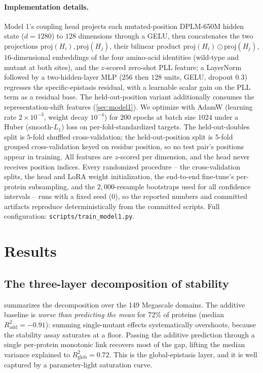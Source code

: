 \documentclass{article}
\begin{document}
\paragraph{Implementation details.}
Model 1's coupling head projects each mutated-position DPLM-650M hidden state
($d=1280$) to $128$ dimensions through a GELU, then concatenates the two
projections $\text{proj}(H_i),\text{proj}(H_j)$, their bilinear product
$\text{proj}(H_i)\odot\text{proj}(H_j)$, $16$-dimensional embeddings of the four
amino-acid identities (wild-type and mutant at both sites), and the $z$-scored
zero-shot PLL feature; a LayerNorm followed by a
two-hidden-layer MLP ($256$ then $128$ units, GELU, dropout $0.3$) regresses the
specific-epistasis residual, with a learnable scalar gain on the PLL term as a
residual base. The held-out-position variant additionally consumes the
representation-shift features (\cref{sec:model1}). We optimize with AdamW
(learning rate $2\times10^{-3}$, weight decay $10^{-4}$) for $200$ epochs at batch
size $1024$ under a Huber (smooth-$L_1$) loss on per-fold-standardized targets.
The held-out-doubles split is $5$-fold shuffled cross-validation; the
held-out-position split is $5$-fold grouped cross-validation keyed on residue
position, so no test pair's positions appear in training. All features are
$z$-scored per dimension, and the head never receives position indices. Every
randomized procedure -- the cross-validation splits, the head and LoRA weight
initialization, the end-to-end fine-tune's per-protein subsampling, and the
$2{,}000$-resample bootstraps used for all confidence intervals -- runs with a
fixed seed ($0$), so the reported numbers and committed artifacts reproduce
deterministically from the committed scripts. Full configuration:
\texttt{scripts/train\_model1.py}.

\section{Results}
\label{sec:results}

\subsection{The three-layer decomposition of stability}
\label{sec:results-decomp}

 summarizes the decomposition over the 149 Megascale
domains. The additive baseline is \emph{worse than predicting the mean} for 72\%
of proteins (median $R^2_{\text{add}}=-0.91$): summing single-mutant effects
systematically overshoots, because the stability assay saturates at a floor.
Passing the additive prediction through a single per-protein monotonic link
recovers most of the gap, lifting the median variance explained to
$R^2_{\text{glob}}=0.72$. This is the global-epistasis layer, and it is well
captured by a parameter-light saturation curve.
\end{document}
